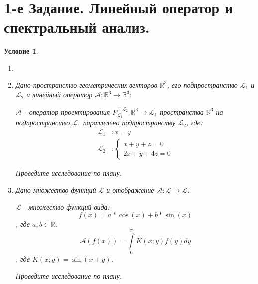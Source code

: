 \documentclass[12pt, a4paper]{article}
\newtheorem*{task}{Условие}
\begin{document}
\section{1-е Задание. Линейный оператор и спектральный анализ.}
\begin{task}
\begin{enumerate}
\item[]

\item[А)] Дано пространство геометрических векторов $\mathbb{R}^3$, его подпространство $\mathcal{L}_1$ и $\mathcal{L}_2$ и линейный оператор $\mathcal{A}: \mathbb{R}^3 \rightarrow \mathbb{R}^3$:

$\mathcal{A}$ - оператор проектирования $P_{\mathcal{L}_1}^{\parallel \mathcal{L}_2}:\mathbb{R}^3 \rightarrow \mathcal{L}_1$ пространства $\mathbb{R}^3$ на подпространство $\mathcal{L}_1$ параллельно подпространству $\mathcal{L}_2$, где:
\begin{equation*}
\begin{aligned}
\mathcal{L}_1 &: x=y\\
\mathcal{L}_2 &:
\begin{cases}
x+y+z=0\\
2x+y+4z=0
\end{cases}
\end{aligned}
\end{equation*}

Проведите исследование по плану.

\item[Б)] Дано множество функций $\mathcal{L}$ и отображение $\mathcal{A}: \mathcal{L} \rightarrow \mathcal{L}$:

$\mathcal{L}$ - множество функций вида:
\begin{equation*}
f(x)=a*\cos(x) + b*\sin(x)
\end{equation*}, 
где $a,b \in \mathbb{R}$.
\begin{equation*}
\mathcal{A}\left(f(x)\right)=\int\limits_{0}^{\pi} K(x;y) f(y) dy
\end{equation*}, где $K(x;y)=\sin(x+y)$.

Проведите исследование по плану.
\end{enumerate}
\end{task}
\end{document}
